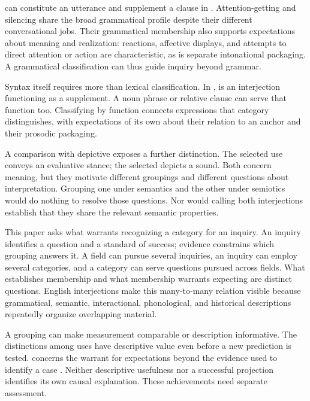 \documentclass[12pt]{article}
\begin{document}
 can
constitute an utterance and supplement a clause in . Attention-getting  and silencing  share
the broad grammatical profile despite their different conversational
jobs. Their grammatical membership also supports expectations about
meaning and realization: reactions, affective displays, and attempts to
direct attention or action are characteristic, as is separate intonational
packaging. A grammatical classification can thus guide inquiry beyond grammar.

Syntax itself requires more than lexical classification. In
,  is an
interjection functioning as a supplement. A noun phrase or relative
clause can serve that function too. Classifying by function connects
expressions that category distinguishes, with expectations of its own
about their relation to an anchor and their prosodic packaging.

A comparison with depictive  exposes a further distinction.
The selected  use conveys an evaluative stance; the selected
 depicts a sound. Both concern meaning, but they motivate
different groupings and different questions about interpretation. Grouping
one under semantics and the other under semiotics would do nothing to
resolve those questions. Nor would calling both interjections establish
that they share the relevant semantic properties.

This paper asks what warrants recognizing a category for an inquiry.
An inquiry identifies a question and a standard of success; evidence
constrains which grouping answers it. A field can pursue several inquiries,
an inquiry can employ several categories, and a category can serve questions
pursued across fields. What establishes membership and what membership
warrants expecting are distinct questions. English interjections make this many-to-many relation
visible because grammatical, semantic, interactional, phonological, and
historical descriptions repeatedly organize overlapping material.

A grouping can make measurement comparable or description informative.
The distinctions among  uses have descriptive value even
before a new prediction is tested.  concerns the
warrant for expectations beyond the evidence used to identify a case
\citep{Goodman1955}. Neither descriptive usefulness nor a successful
projection identifies its own causal explanation. These achievements
need separate assessment.
\end{document}

